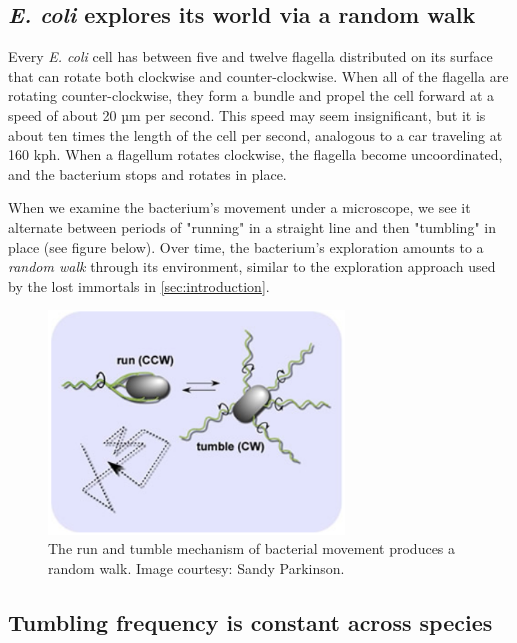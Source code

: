 \subsection{\textit{E. coli} explores its world via a random walk}


Every \textit{E. coli} cell has between five and twelve flagella distributed on its surface \citep{Sim_2017} that can rotate both clockwise and counter-clockwise. When all of the flagella are rotating counter-clockwise, they form a bundle and propel the cell forward at a speed of about 20 µm per second. This speed may seem insignificant, but it is about ten times the length of the cell per second, analogous to a car traveling at 160 kph. When a flagellum rotates clockwise, the flagella become uncoordinated, and the bacterium stops and rotates in place.\citep{Baker_2005}

When we examine the bacterium's movement under a microscope, we see it alternate between periods of "running" in a straight line and then "tumbling" in place (see figure below). Over time, the bacterium's  exploration amounts to a \textit{random walk} through its environment, similar to the exploration approach used by the lost immortals in \autoref{sec:introduction}.

\begin{figure}[h]
\centering
\mySfFamily
\includegraphics[width = 0.7\textwidth]{../images/chemotaxis_intro_runtumble.png}
\caption{The run and tumble mechanism of bacterial movement produces a random walk. Image courtesy: Sandy Parkinson.}
\label{fig:chemotaxis_intro_runtumble}
\end{figure}

\FloatBarrier
{}
\subsection{Tumbling frequency is constant across species}

